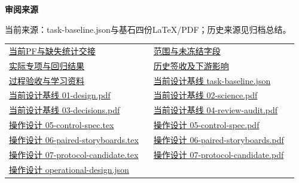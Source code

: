 \documentclass[11pt,a4paper]{article}
\newcommand{\reviewsubsection}[1]{\par\Needspace{4\baselineskip}\vspace{4pt}\begin{center}{\titlelatin\titlecjk\bfseries\fontsize{12}{18}\selectfont #1}\end{center}}
\begin{document}
\begin{minipage}{\linewidth}
\reviewsubsection{3.4 审阅来源}
当前来源：task-\allowbreak{}baseline.json与基石四份LaTeX/\allowbreak{}PDF；历史来源见归档总结。


\begingroup\small\setlength{\tabcolsep}{4pt}\begin{tabular}{@{}p{0.48\linewidth}p{0.48\linewidth}@{}}
\href{file:///D:/Agent/srp/agent/tasks/A-02/outputs/current-statistics.md}{当前PF与缺失统计交接} & \href{file:///D:/Agent/srp/agent/tasks/A-02/outputs/current-statistics.json}{范围与未冻结字段}\\[4pt]
\href{file:///D:/Agent/srp/agent/tasks/A-02/evidence/verification.json}{实际专项与回归结果} & \href{file:///D:/Agent/srp/agent/tasks/A-02/evidence/consumer-impact.md}{历史签收及下游影响}\\[4pt]
\href{file:///D:/Agent/srp/agent/tasks/A-02/TASK.md}{过程验收与学习资料} & \href{file:///D:/Agent/srp/agent/design/design-foundation-20261008/task-baseline.json}{当前设计基线 task-\allowbreak{}baseline.json}\\[4pt]
\href{file:///D:/Agent/srp/agent/design/design-foundation-20261008/01-design.pdf}{当前设计基线 01-\allowbreak{}design.pdf} & \href{file:///D:/Agent/srp/agent/design/design-foundation-20261008/02-science.pdf}{当前设计基线 02-\allowbreak{}science.pdf}\\[4pt]
\href{file:///D:/Agent/srp/agent/design/design-foundation-20261008/03-decisions.pdf}{当前设计基线 03-\allowbreak{}decisions.pdf} & \href{file:///D:/Agent/srp/agent/design/design-foundation-20261008/04-review-audit.pdf}{当前设计基线 04-\allowbreak{}review-\allowbreak{}audit.pdf}\\[4pt]
\href{file:///D:/Agent/srp/agent/design/design-foundation-20261008/05-control-spec.tex}{操作设计 05-\allowbreak{}control-\allowbreak{}spec.tex} & \href{file:///D:/Agent/srp/agent/design/design-foundation-20261008/05-control-spec.pdf}{操作设计 05-\allowbreak{}control-\allowbreak{}spec.pdf}\\[4pt]
\href{file:///D:/Agent/srp/agent/design/design-foundation-20261008/06-paired-storyboards.tex}{操作设计 06-\allowbreak{}paired-\allowbreak{}storyboards.tex} & \href{file:///D:/Agent/srp/agent/design/design-foundation-20261008/06-paired-storyboards.pdf}{操作设计 06-\allowbreak{}paired-\allowbreak{}storyboards.pdf}\\[4pt]
\href{file:///D:/Agent/srp/agent/design/design-foundation-20261008/07-protocol-candidate.tex}{操作设计 07-\allowbreak{}protocol-\allowbreak{}candidate.tex} & \href{file:///D:/Agent/srp/agent/design/design-foundation-20261008/07-protocol-candidate.pdf}{操作设计 07-\allowbreak{}protocol-\allowbreak{}candidate.pdf}\\[4pt]
\href{file:///D:/Agent/srp/agent/design/design-foundation-20261008/operational-design.json}{操作设计 operational-\allowbreak{}design.json} & \\[4pt]
\end{tabular}\endgroup\end{minipage}\par
\end{document}
